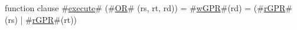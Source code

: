function clause #\hyperref[zexecute]{execute}# (#\hyperref[zOR]{OR}# (rs, rt, rd)) =
  {
    #\hyperref[zwGPR]{wGPR}#(rd) = (#\hyperref[zrGPR]{rGPR}#(rs) | #\hyperref[zrGPR]{rGPR}#(rt))
  }

